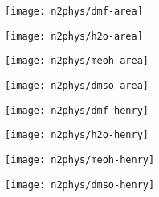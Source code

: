 \begin{figure}[htb]
    \centering

    \begin{subfigure}{0.25\linewidth}
        \texttt{[image: n2phys/dmf-area]}%
        \caption{}%
        \label{def:fgr:n2phys-dmf-area}
    \end{subfigure}%
    \begin{subfigure}{0.25\linewidth}
        \texttt{[image: n2phys/h2o-area]}%
        \caption{}%
        \label{def:fgr:n2phys-h2o-area}
    \end{subfigure}%
    \begin{subfigure}{0.25\linewidth}
        \texttt{[image: n2phys/meoh-area]}%
        \caption{}%
        \label{def:fgr:n2phys-meoh-area}
    \end{subfigure}%
    \begin{subfigure}{0.25\linewidth}
        \texttt{[image: n2phys/dmso-area]}%
        \caption{}%
        \label{def:fgr:n2phys-dmso-area}
    \end{subfigure}%

    \begin{subfigure}{0.25\linewidth}
        \texttt{[image: n2phys/dmf-henry]}%
        \caption{}%
        \label{def:fgr:n2phys-dmf-henry}
    \end{subfigure}%
    \begin{subfigure}{0.25\linewidth}
        \texttt{[image: n2phys/h2o-henry]}%
        \caption{}%
        \label{def:fgr:n2phys-h2o-henry}
    \end{subfigure}%
    \begin{subfigure}{0.25\linewidth}
        \texttt{[image: n2phys/meoh-henry]}%
        \caption{}%
        \label{def:fgr:n2phys-meoh-henry}
    \end{subfigure}%
    \begin{subfigure}{0.25\linewidth}
        \texttt{[image: n2phys/dmso-henry]}%
        \caption{}%
        \label{def:fgr:n2phys-dmso-henry}
    \end{subfigure}%


\end{figure}
